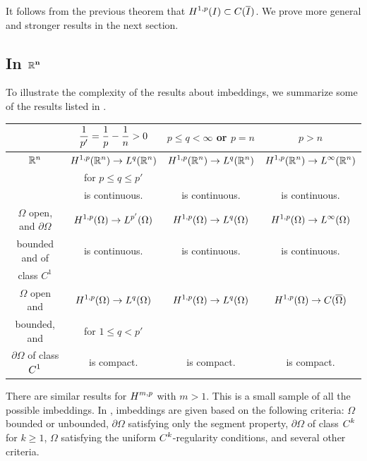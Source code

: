 It follows from the previous theorem that
$\displaystyle H^{1,p}(I) \subset C(\overline{I})$.  We prove more
general and stronger results in the next section.

\subsection{In $\displaystyle \mathbf{\mathbb{R}^n}$}

To illustrate the complexity of the results about imbeddings, we
summarize some of the results listed in \cite{Br}.
\begin{center}
\begin{tabular}{c|c|c|c}
& $\displaystyle \frac{1}{p'} = \frac{1}{p} - \frac{1}{n} > 0$
& $p\leq q < \infty$ or $p = n$ & $ p > n$ \\
\hline  
\rule{0pt}{1.2em} $\mathbb{R}^n$ & $\displaystyle H^{1,p}(\mathbb{R}^n)
 \rightarrow L^{q}(\mathbb{R}^n)$
& $\displaystyle H^{1,p}(\mathbb{R}^n) \rightarrow L^{q}(\mathbb{R}^n)$
& $\displaystyle H^{1,p}(\mathbb{R}^n) \rightarrow L^{\infty}(\mathbb{R}^n)$ \\
& for $p \leq q \leq p'$ & & \\
& is continuous. & is continuous. & is continuous. \\
\hline
\rule{0pt}{1.2em} $\Omega$ open, and $\partial \Omega$
& $\displaystyle H^{1,p}(\Omega) \rightarrow L^{p'}(\Omega)$
& $\displaystyle H^{1,p}(\Omega) \rightarrow L^{q}(\Omega)$
& $\displaystyle H^{1,p}(\Omega) \rightarrow L^{\infty}(\Omega)$ \\
bounded and of & is continuous. & is continuous. & is continuous. \\
class $C^1$ & & & \\
\hline
\rule{0pt}{1.2em} $\Omega$ open and
& $\displaystyle H^{1,p}(\Omega) \rightarrow L^{q}(\Omega)$
& $\displaystyle H^{1,p}(\Omega) \rightarrow L^{q}(\Omega)$
& $\displaystyle H^{1,p}(\Omega) \rightarrow C(\overline{\Omega})$ \\
bounded, and & for $1 \leq q < p'$ & & \\
$\partial \Omega$ of class $\displaystyle C^1$ & is compact. & is compact.
& is compact. \\
\hline
\end{tabular}
\end{center}
There are similar results for $\displaystyle H^{m,p}$ with $m>1$.
This is a small sample of all the possible imbeddings.  In \cite{Ad},
imbeddings are given based on the following criteria: $\Omega$ bounded or
unbounded, $\partial \Omega$ satisfying only the segment property,
$\partial \Omega$ of class $\displaystyle C^k$ for $k\geq 1$, $\Omega$
satisfying the uniform $\displaystyle C^k$-regularity conditions, and
several other criteria.

